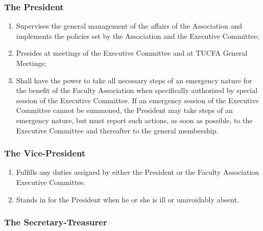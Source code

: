 \documentclass[12pt]{article}
\begin{document}
\subsubsection{The President}

\begin{enumerate}
\item
Supervises the general management of the affairs of the Association and implements the policies set by the Association and the Executive Committee;
\item
Presides at meetings of the Executive Committee and at TUCFA General Meetings;
\item
Shall have the power to take all necessary steps of an emergency nature for the benefit of the Faculty Association when specifically authorized by special session of the Executive Committee. If an emergency session of the Executive Committee cannot be summoned, the President may take steps of an emergency nature, but must report such actions, as soon as possible, to the Executive Committee and thereafter to the general membership.
\end{enumerate}

\subsubsection{The Vice-President}

\begin{enumerate}
\item
Fulfills any duties assigned by either the President or the Faculty Association Executive Committee.
\item
Stands in for the President when he or she is ill or unavoidably absent.
\end{enumerate}

\subsubsection{The Secretary-Treasurer}
\end{document}
